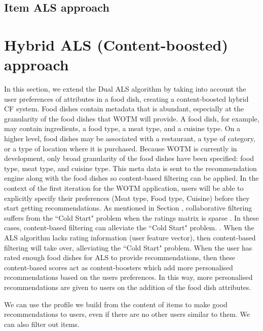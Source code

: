 
\subsection{Item ALS approach}

\section{Hybrid ALS (Content-boosted) approach}



In this section, we extend the Dual ALS algorithm by taking into account the user preferences of attributes in a food dish, creating a content-boosted hybrid CF system. Food dishes contain metadata that is abundant, especially at the granularity of the food dishes that WOTM will provide. A food dish, for example, may contain ingredients, a food type, a meat type, and a cuisine type. On a higher level, food dishes may be associated with a restaurant, a type of category, or a type of location where it is purchased. Because WOTM is currently in development, only broad granularity of the food dishes have been specified: food type, meat type, and cuisine type. This meta data is sent to the recommendation engine along with the food dishes so content-based filtering can be applied. In the context of the first iteration for the WOTM application, users will be able to explicitly specify their preferences (Meat type, Food type, Cuisine) before they start getting recommendations. As mentioned in Section , collaborative filtering suffers from the ``Cold Start" problem when the ratings matrix is sparse . In these cases, content-based filtering can alleviate the ``Cold Start" problem. . When the ALS algorithm lacks rating information (user feature vector), then content-based filtering will take over, alleviating the ``Cold Start" problem. When the user has rated enough food dishes for ALS to provide recommendations, then these content-based scores act as content-boosters which add more personalised recommendations based on the users preferences. In this way, more personalised recommendations are given to users on the addition of the food dish attributes.


\todo{}
 We can use the profile we build from the content
of items to make good recommendations to
users, even if there are no other users similar to
them. We can also filter out items.



